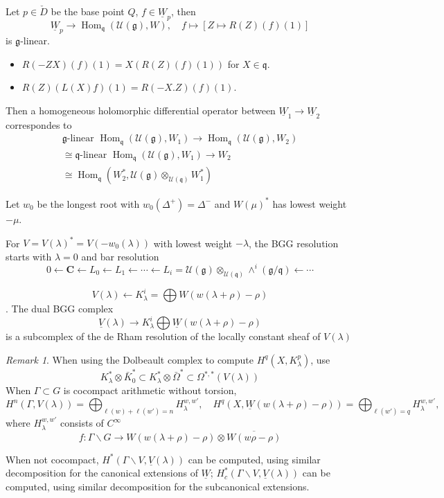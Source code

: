 \documentclass[leqno]{amsart}
\newcommand{\C}{\mathbf C}
\newcommand{\1}{\mathbf{1}}
\newcommand{\cfg}{\mathfrak{g}}
\newcommand{\cfq}{\mathfrak{q}}
\DeclareMathOperator{\Hom}{Hom}
\theoremstyle{definition}
\theoremstyle{remark}
\newtheorem{rem}[thm]{Remark}
\begin{document}
Let $p\in \check{D}$ be the base point $Q$,
$f\in \underline{W}_p$,
then
\[
	\underline{W}_p\to
	\Hom_\cfq(\mathcal{U}(\cfg),W),\quad
	f\mapsto 
	[Z\mapsto R(Z)(f)(1)]
\]
is $\cfg$-linear.
 \begin{itemize}
	 \item $R(-ZX)(f)(1)=X(R(Z)(f)(1))$
		 for  $X\in\cfq$.
	 \item $R(Z)(L(X)f)(1)=R(-X.Z)(f)(1)$.
\end{itemize}
Then a homogeneous holomorphic differential 
operator between
$\underline{W}_1\to \underline{W}_2$
correspondes to 
 \begin{multline*}
 	\cfg\text{-linear }
	\Hom_\cfq(\mathcal{U}(\cfg),W_1)\to
	\Hom_\cfq(\mathcal{U}(\cfg),W_2)\\
	\cong 
	\cfq\text{-linear }
	\Hom_\cfq(\mathcal{U}(\cfg),W_1)\to
	W_2\\
	\cong 
	\Hom_\cfq(
	W_2^*,
	\mathcal{U}(\cfg)
	\otimes_{\mathcal{U}(\cfq)}W_1^*)
 \end{multline*}

Let $w_0$ be the longest root 
with  $w_0(\Delta^+)=\Delta^-$
and  $W(\mu)^*$ 
has lowest weight  $-\mu$.

For  $V=V(\lambda)^*=V(-w_0(\lambda))$
with lowest weight  $-\lambda$,
the BGG resolution starts with $\lambda=0$ and
bar resolution
\[
0\leftarrow \C	
\leftarrow L_0
\leftarrow L_1
\leftarrow \cdots
\leftarrow L_i
=\mathcal{U}(\cfg)\otimes_{\mathcal{U}(\cfq)}
\wedge^i(\cfg/\cfq)
\leftarrow \cdots
\]

\[
	V(\lambda)\leftarrow
	K^i_\lambda=
	\bigoplus W(w(\lambda+\rho)-\rho)
\].
The dual BGG complex
\[
	\underline{V}(\lambda)
	\to K^i_\lambda
	\bigoplus \underline{W}
	(w(\lambda+\rho)-\rho)
\]
is a subcomplex 
of the de Rham resolution
of the locally constant sheaf of $V(\lambda)$

 \begin{rem}
	When using the Dolbeault complex
	to compute $H^q(X,K^p_\lambda)$,
	use 
	 \[
		K^*_\lambda\otimes \bar{K}_0^*
		\subset
		K^*_\lambda\otimes \bar{\Omega}^*
		\subset 
		\Omega^{*,*}(V(\lambda))
	\]
	When $\Gamma\subset G$
	is cocompact arithmetic
	without torsion,
	 \[
		 H^n(\Gamma,V(\lambda))=
		 \bigoplus_{\ell(w)+\ell(w')=n}
		 H^{w,w'}_\lambda,\quad
		 H^q(X, \underline{W}
		 (w(\lambda+\rho)-\rho))=
		 \bigoplus_{\ell(w')=q}
		 H^{w,w'}_\lambda,\quad
	\]
	where 
	$H^{w,w'}_\lambda$ 
	consists of  $C^\infty$
	 \[
		f\colon \Gamma\backslash G\to
		W(w(\lambda+\rho)-\rho)\otimes
		\overline{W(w\rho-\rho)}
	\]

	When not cocompact,
	$H^*(\Gamma\backslash V,
	\underline{V}(\lambda))$
	can be computed,
	using similar decomposition
	for the canonical extensions
	of  $\underline{W}$; 
	$H^*_c(\Gamma\backslash V,
	\underline{V}(\lambda))$
	can be computed,
	using similar decomposition
	for the subcanonical extensions.
\end{rem}
\end{document}
